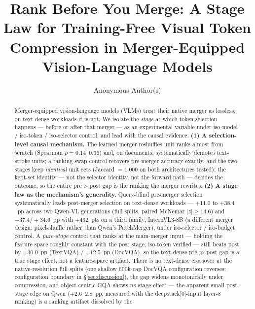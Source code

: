 \documentclass[sigconf,review,anonymous]{acmart}
\begin{document}
\title{Rank Before You Merge: A Stage Law for Training-Free Visual Token
  Compression in Merger-Equipped Vision-Language Models}

\author{Anonymous Author(s)}

\begin{abstract}
Merger-equipped vision-language models (VLMs) treat their native merger as
lossless; on text-dense workloads it is not. We isolate the \emph{stage} at
which token selection happens --- before or after that merger --- as an
experimental variable under iso-model / iso-token / iso-selector control, and
lead with the causal evidence. \textbf{(1) A selection-level causal
mechanism.} The learned merger reshuffles unit ranks almost from scratch
(Spearman $\rho = 0.14$--$0.36$) and, on documents, systematically demotes
text-stroke units; a ranking-swap control recovers pre-merger accuracy exactly,
and the two stages keep \emph{identical} unit sets (Jaccard $= 1.000$ on both
architectures tested): the kept-set identity --- not the selector identity,
not the forward path --- decides the outcome, so the entire pre$>$post gap is
the ranking the merger rewrites. \textbf{(2) A stage law as the mechanism's
generality.} Query-blind pre-merger selection systematically leads post-merger
selection on text-dense workloads --- $+11.0$ to $+38.4$~pp across two Qwen-VL
generations (full splits, paired McNemar $|z| \geq 14.6$) and $+37.4 /
+34.6$~pp with $+432$~pts on a third family, InternVL3-8B (a different merger
design: pixel-shuffle rather than Qwen's PatchMerger), under iso-selector /
iso-budget control. A \emph{pure-stage} control that ranks at the main-merger
input --- holding the feature space roughly constant with the post stage,
iso-token verified --- still beats post by $+30.0$~pp (TextVQA) / $+12.5$~pp
(DocVQA), so the text-dense pre$\gg$post gap is a true stage effect, not a
feature-space artifact. There is no text-dense crossover at the native-resolution
full splits (one shallow 600k-cap DocVQA configuration reverses; configuration
boundary in \S\ref{sec:discussion}), the gap widens monotonically under
compression, and object-centric GQA shows \emph{no} stage effect --- the
apparent small post-stage edge on Qwen ($+2.6$--$2.8$~pp, measured with the
deepstack[0]-input layer-8 ranking) is a ranking artifact dissolved by the

\end{abstract}
\end{document}
